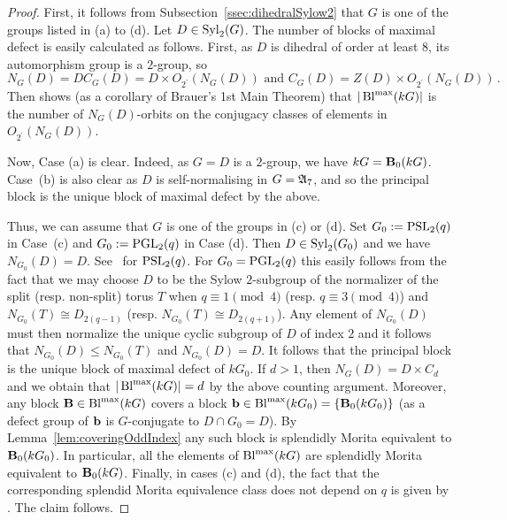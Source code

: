 \begin{proof}
First, it follows from Subsection~\ref{ssec:dihedralSylow2} that $G$ is one of the groups listed in (a) to (d). 
Let $D\in\operatorname{Syl}_2(G)$. 
The number of blocks of maximal defect is easily calculated as follows. 
First, as $D$ is dihedral of order at least $8$, its automorphism group is a $2$-group, so
\[
N_G(D)= DC_G(D) =D\times O_{2^\prime}(N_G(D))   
\text{ and } 
C_G(D)=Z(D)\times O_{2^\prime}({N_G(D)})\,.
\]
Then  \cite[Lemma 2.1]{NavarroTiep12} shows (as a corollary of Brauer's 1st Main Theorem)  that  {$|\operatorname{Bl}^{\mathrm{max}}(kG)|$} is the number of $N_G(D)$-orbits on the conjugacy classes of elements in $O_{2^\prime}({N_G(D)})$.
\par
Now, Case (a) is clear. Indeed, as $G=D$ is a $2$-group, we have $kG={\mathbf{B}}_0(kG)$. Case~(b) is also clear as $D$ is self-normalising in $G={\mathfrak{A}}_7$, and so the principal block is the unique block of maximal defect by the above.\par
Thus, we can assume that $G$ is one of the groups in (c) or (d).  Set $G_0:=\operatorname{PSL}_2(q)$ in Case~(c) and $G_0:=\operatorname{PGL}_2(q)$ in Case (d). Then $D\in\operatorname{Syl}_2(G_0)$ and  we have $N_{G_0}(D)=D$. See~\cite[Theorem~1.4.3(d)]{BonnafeBookSL2q} for $\operatorname{PSL}_2(q)$. 
For $G_0=\operatorname{PGL}_2(q)$ this easily follows from the fact that we may choose $D$ to be the Sylow $2$-subgroup of the normalizer of the split (resp. non-split) torus $T$ when $q\equiv 1\pmod{4}$ (resp. $q\equiv 3\pmod{4}$) and $N_{G_0}(T)\cong D_{2(q-1)}$ (resp. $N_{G_0}(T)\cong D_{2(q+1)}$). Any element of $N_{G_0}(D)$ must then normalize the unique cyclic subgroup of $D$ of index $2$ and it follows that $N_{G_0}(D)\leq N_{G_0}(T)$ and $N_{G_0}(D)=D$.
It follows that the principal block is the unique block of maximal defect of $kG_0$. If $d>1$, then $N_G(D)=D\times C_d$ and we obtain that $|\operatorname{Bl}^{\mathrm{max}}(kG)|=d$ by the above counting argument. Moreover, any block ${\mathbf{B}}\in\operatorname{Bl}^{\mathrm{max}}(kG)$ 
covers a block ${\mathbf{b}}\in\operatorname{Bl}^{\mathrm{max}}(kG_0)=\{{\mathbf{B}}_0(kG_0)\}$ (as a defect group of ${\mathbf{b}}$ is $G$-conjugate to $D\cap G_0=D$). By Lemma~\ref{lem:coveringOddIndex}
any such block is splendidly Morita equivalent to ${\mathbf{B}}_0(kG_0)$. In particular, all the elements of $\operatorname{Bl}^{\mathrm{max}}(kG)$ are splendidly Morita equivalent to ${\mathbf{B}}_0(kG)$.
Finally,  in cases {\rm(c)} and {\rm(d)}, the fact that the corresponding splendid Morita equivalence class does not depend on $q$ is given by \cite[Theorem~1.1]{KoLa19}.
The claim follows.
\end{proof}




